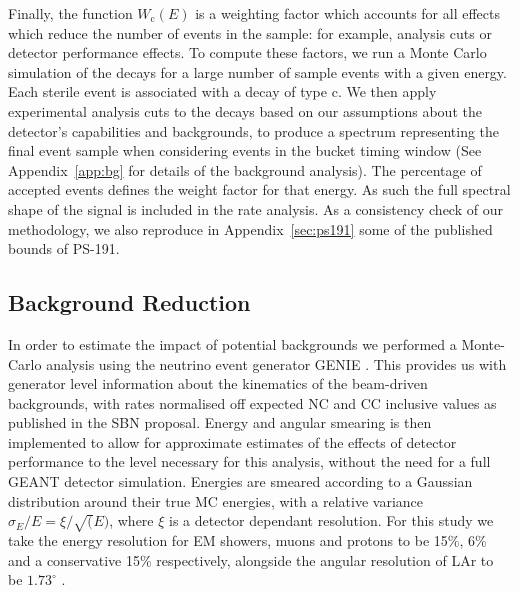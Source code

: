 \documentclass[11pt, a4paper]{article}
\newcommand{\refapp}[1]{Appendix~\ref{#1}}
\begin{document}
%
Finally, the function $W_\text{c}(E)$ is a weighting factor which accounts for
all effects which reduce the number of events in the sample: for example,
analysis cuts or detector performance effects.
%
To compute these factors, we run a Monte Carlo simulation of the decays for a
large number of sample events with a given energy. Each sterile event is
associated with a decay of type $\text{c}$. We then apply experimental analysis
cuts to the decays based on our assumptions about the detector's capabilities
and backgrounds, to produce a spectrum representing the final event sample when
considering events in the bucket timing window (See \refapp{app:bg} for
details of the background analysis). The percentage of accepted events defines
the weight factor for that energy. As such the full spectral shape of the
signal is included in the rate analysis. As a consistency check of our
methodology, we also reproduce in \refapp{sec:ps191} some of the published
bounds of PS-191. 

\subsection{\label{sec:backgroundesttimate}Background Reduction}
In order to estimate the impact of potential backgrounds we
performed a Monte-Carlo analysis using the neutrino event generator GENIE
\cite{Andreopoulos:2009rq}. This provides us with generator level information about the
kinematics of the beam-driven backgrounds, with rates normalised off expected
NC and CC inclusive values as published in the SBN proposal. Energy and angular
smearing is then implemented to allow for approximate estimates of the effects
of detector performance to the level necessary for this analysis, without the
need for a full GEANT detector simulation. Energies are smeared according to a
Gaussian distribution around their true MC energies, with a relative variance
$\sigma_E/E = \xi/ \sqrt(E) $, where $\xi$ is a detector dependant resolution.
For this study we take the energy resolution for EM showers, muons and protons
to be 15\%, 6\% and a conservative 15\% respectively, alongside the angular
resolution of LAr to be $1.73^{\circ}$ \cite{Antonello:2015lea}. 
\end{document}
